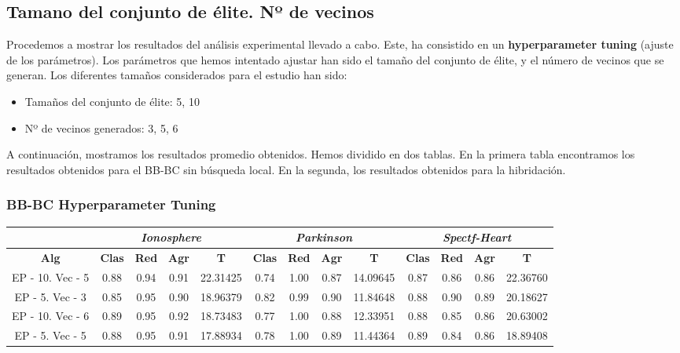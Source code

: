 \documentclass[10pt, a4paper]{article}
\theoremstyle{theorem-style}
\theoremstyle{theorem-style}
\theoremstyle{theorem2-style}
\theoremstyle{definition-style}
\theoremstyle{remark-style}
\theoremstyle{example-style}
\theoremstyle{definition-style}
\theoremstyle{remark-style}
\theoremstyle{remark-style}
\begin{document}
\subsection{Tamano del conjunto de élite. Nº de vecinos}

Procedemos a mostrar los resultados del análisis experimental llevado a cabo. Este, ha consistido en un \textbf{hyperparameter tuning} (ajuste de los parámetros). Los parámetros que hemos intentado ajustar han sido el tamaño del conjunto de élite, y el número de vecinos que se generan. Los diferentes tamaños considerados para el estudio han sido: 

\begin{itemize}
\item Tamaños del conjunto de élite: 5, 10
\item Nº de vecinos generados: 3, 5, 6
\end{itemize}

A continuación, mostramos los resultados promedio obtenidos. Hemos dividido en dos tablas. En la primera tabla encontramos los resultados obtenidos para el BB-BC sin búsqueda local. En la segunda, los resultados obtenidos para la hibridación.

\subsubsection{BB-BC Hyperparameter Tuning}
\begin{table}[h]
\begin{tabular}{ccccc|cccc|cccc}
\centering
 & \multicolumn{4}{c}{\textit{Ionosphere}} & \multicolumn{4}{c}{\textit{Parkinson}} & \multicolumn{4}{c}{\textit{Spectf-Heart}} \\ \hline
\textbf{Alg} & \textbf{Clas} & \textbf{Red} & \textbf{Agr} & \textbf{T} & \textbf{Clas} & \textbf{Red} & \textbf{Agr} & \textbf{T} & \textbf{Clas} & \textbf{Red} & \textbf{Agr} & \textbf{T} \\
\hline
EP - 10. Vec - 5 & 0.88 & 0.94 & 0.91 & 22.31425 &	0.74 & 1.00 & 0.87 & 14.09645 &		0.87 & 0.86 & 0.86 & 22.36760\\
EP - 5. Vec - 3 & 0.85 & 0.95 & 0.90 & 18.96379&	0.82 & 0.99 & 0.90 & 11.84648	&	0.88 & 0.90 & 0.89 & 20.18627 \\
EP - 10. Vec - 6 & 0.89 & 0.95 & 0.92 & 18.73483	&0.77 & 1.00 & 0.88 & 12.33951	&	0.88 & 0.85 & 0.86 & 20.63002\\
EP - 5. Vec - 5 & 0.88 & 0.95 & 0.91 & 17.88934&	0.78 & 1.00 & 0.89 & 11.44364	&	0.89 & 0.84 & 0.86 & 18.89408
\end{tabular}
\end{table}
\end{document}
